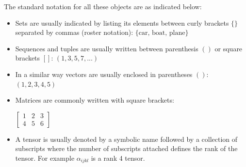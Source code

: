 The standard notation for all these objects are as indicated below:
\begin{itemize}
    \item Sets are usually indicated by listing its elements between curly brackets $\{\}$ separated by commas (roster notation): $\{\textrm{car, boat, plane}\}$
    \item Sequences and tuples are usually written between parenthesis $()$ or square brackets $[]$: $(1,3,5,7,...)$ %
    \item In a similar way vectors are usually enclosed in parentheses $()$: $(1,2,3,4,5)$ %
    \item Matrices are commonly written with square brackets: %
    
    $
    \begin{bmatrix}
        1 & 2 & 3 \\
        4 & 5 & 6
    \end{bmatrix} 
    $
    \item A tensor is usually denoted by a symbolic name followed by a collection of subscripts where the number of subscripts attached defines the rank of the tensor.
    For example $\alpha_{ijkl}$ is a rank 4 tensor.
\end{itemize}
%    

